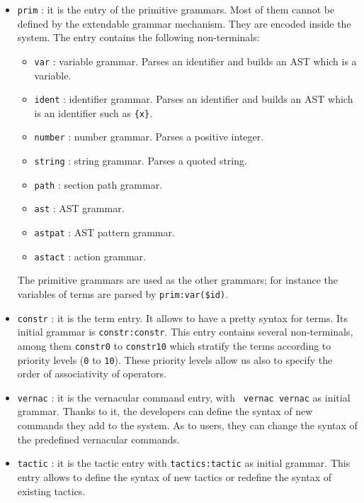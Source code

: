 \begin{itemize}
\item \verb+prim+ : it is the entry of the primitive grammars. Most of
  them cannot be defined by the extendable grammar mechanism. They are
  encoded inside the system. The entry contains the following
  non-terminals:

\begin{itemize}
\item \verb+var+ : variable grammar. Parses an identifier and builds
an AST which is a variable.
\item \verb+ident+ : identifier grammar. Parses an identifier and
builds an AST which is an identifier such as \verb+{x}+.
\item \verb+number+ : number grammar. Parses a positive integer.
\item \verb+string+ : string grammar. Parses a quoted string.
\item \verb+path+ : section path grammar.
\item \verb+ast+ : AST grammar.
\item \verb+astpat+ : AST pattern grammar.
\item \verb+astact+ : action grammar.
\end{itemize}

The primitive grammars are used as the other grammars; for instance
the variables of terms are parsed by \verb+prim:var($id)+.

\item \verb+constr+ : it is the term entry. It allows to have a pretty
syntax for terms. Its initial grammar is {\tt constr:constr}. This
entry contains several non-terminals, among them {\tt constr0} to
{\tt constr10} which stratify the terms according to priority levels
(\verb+0+ to \verb+10+). These priority levels allow us also to
specify the order of associativity of operators.


\item \verb+vernac+ : it is the vernacular command entry, with {\tt
  vernac vernac} as initial grammar. Thanks to it, the developers can
  define the syntax of new commands they add to the system. As to
  users, they can change the syntax of the predefined vernacular
  commands.

\item \verb+tactic+ : it is the tactic entry with {\tt tactics:tactic}
  as initial grammar. This entry allows to define the syntax of new
  tactics or redefine the syntax of existing tactics.

\end{itemize}

